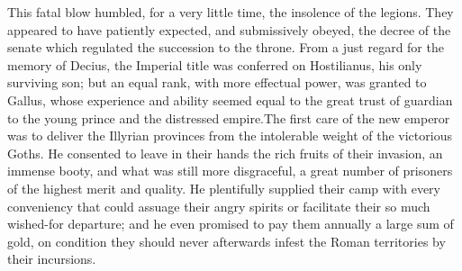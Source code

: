 





This fatal blow humbled, for a very little time, the insolence of
the legions. They appeared to have patiently expected, and
submissively obeyed, the decree of the senate which regulated the
succession to the throne. From a just regard for the memory of
Decius, the Imperial title was conferred on Hostilianus, his only
surviving son; but an equal rank, with more effectual power, was
granted to Gallus, whose experience and ability seemed equal to
the great trust of guardian to the young prince and the
distressed empire.\footnotemark[50] The first care of the new emperor was to
deliver the Illyrian provinces from the intolerable weight of the
victorious Goths. He consented to leave in their hands the rich
fruits of their invasion, an immense booty, and what was still
more disgraceful, a great number of prisoners of the highest
merit and quality. He plentifully supplied their camp with every
conveniency that could assuage their angry spirits or facilitate
their so much wished-for departure; and he even promised to pay
them annually a large sum of gold, on condition they should never
afterwards infest the Roman territories by their incursions.\footnotemark[51]




